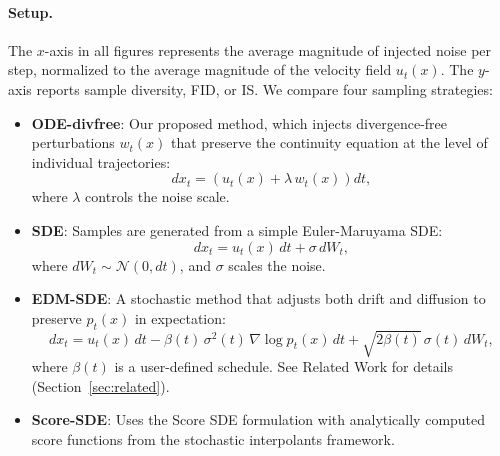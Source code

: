 \documentclass{article}
\begin{document}
\paragraph{Setup.}
The $x$-axis in all figures represents the average magnitude of injected noise per step, normalized to the average magnitude of the velocity field \( u_t(x) \). The $y$-axis reports sample diversity, FID, or IS. We compare four sampling strategies:

\begin{itemize}
  \item \textbf{ODE-divfree}: Our proposed method, which injects divergence-free perturbations \( w_t(x) \) that preserve the continuity equation at the level of individual trajectories:
  \[
  dx_t = \left(u_t(x) + \lambda\,w_t(x)\right) dt,
  \]
  where \( \lambda \) controls the noise scale.
  \item \textbf{SDE}: Samples are generated from a simple Euler-Maruyama SDE:
  \[
  dx_t = u_t(x)\,dt + \sigma\,dW_t,
  \]
  where \( dW_t \sim \mathcal{N}(0, dt) \), and \(\sigma\) scales the noise.
  \item \textbf{EDM-SDE}: A stochastic method that adjusts both drift and diffusion to preserve \(p_t(x)\) in expectation:
  \[
  dx_t = u_t(x)\,dt - \beta(t)\,\sigma^2(t)\,\nabla \log p_t(x)\,dt + \sqrt{2\beta(t)}\,\sigma(t)\,dW_t,
  \]
  where \(\beta(t)\) is a user-defined schedule. See Related Work for details (Section~\ref{sec:related}).
  \item \textbf{Score-SDE}: Uses the Score SDE formulation with analytically computed score functions from the stochastic interpolants framework.
\end{itemize}
\end{document}
